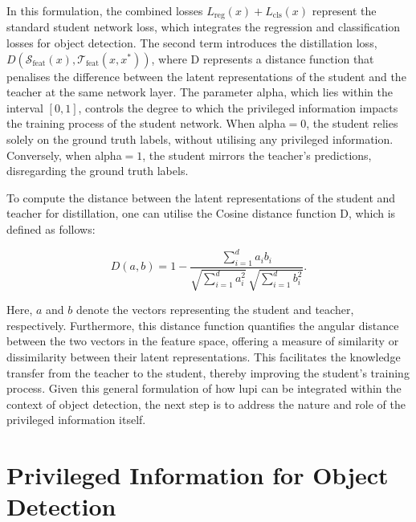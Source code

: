 \noindent In this formulation, the combined losses \( L_{\text{reg}}(x) + L_{\text{cls}}(x) \) represent the standard student network loss, which integrates the regression and classification losses for object detection. The second term introduces the distillation loss, \( D(\mathcal{S}_{\text{feat}}(x), \mathcal{T}_{\text{feat}}(x, x^*)) \), where \gls{D} represents a distance function that penalises the difference between the latent representations of the student and the teacher at the same network layer. The parameter \gls{alpha}, which lies within the interval \( [0, 1] \), controls the degree to which the privileged information impacts the training process of the student network. When \gls{alpha}$=0$, the student relies solely on the ground truth labels, without utilising any privileged information. Conversely, when \gls{alpha}$=1$, the student mirrors the teacher's predictions, disregarding the ground truth labels.

To compute the distance between the latent representations of the student and teacher for distillation, one can utilise the Cosine distance function \gls{D}, which is defined as follows:

\begin{equation} \label{eq:cosine_distance}
D(a, b) = 1 - \frac{\sum_{i=1}^{d} a_i b_i}{\sqrt{\sum_{i=1}^{d} a_i^2} \, \sqrt{\sum_{i=1}^{d} b_i^2}} .
\end{equation}

\noindent Here, \( a \) and \( b \) denote the vectors representing the student and teacher, respectively. Furthermore, this distance function quantifies the angular distance between the two vectors in the feature space, offering a measure of similarity or dissimilarity between their latent representations. This facilitates the knowledge transfer from the teacher to the student, thereby improving the student's training process.
Given this general formulation of how \gls{lupi} can be integrated within the context of object detection, the next step is to address the nature and role of the privileged information itself.

\section{Privileged Information for Object Detection}
\label{sec:4_privileged_information}

